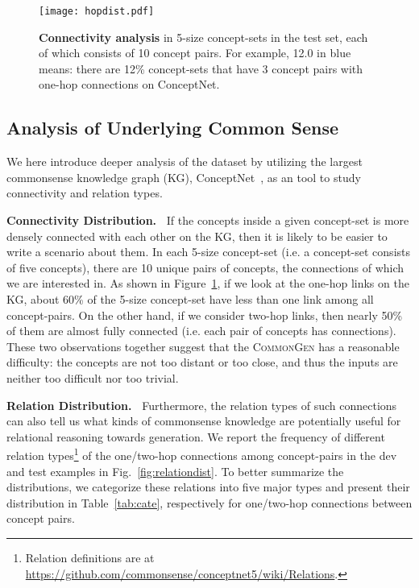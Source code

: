 \documentclass[11pt,a4paper]{article}
\begin{document}
	
    \begin{figure}[t!]
		\centering
		\texttt{[image: hopdist.pdf]}
		\caption{\small \textbf{Connectivity analysis} in 5-size concept-sets in the test set, each of which consists of 10 concept pairs. {For example, 12.0 in blue means: there are 12\% concept-sets that have 3 concept pairs with one-hop connections on ConceptNet.}}
		\label{fig:connectivity}
	\end{figure}

	
	
	\subsection{Analysis of Underlying Common Sense}
	\label{ssec:analysis}
We here introduce deeper analysis of the dataset by utilizing the largest commonsense knowledge graph (KG), ConceptNet~\cite{Speer2017ConceptNet5A}, as an tool to study connectivity and relation types.
    
    \smallskip
    \noindent
    \textbf{Connectivity Distribution.~} 
    If the concepts inside a given concept-set is more densely connected with each other on the KG, then it is likely to be easier to write a scenario about them.
In each 5-size concept-set (i.e. a concept-set consists of five concepts), 
    there are 10 unique pairs of concepts, the connections of which we are interested in. 
    As shown in Figure~\ref{fig:connectivity}, if we look at the one-hop links on the KG, about 60\% of the 5-size concept-set have less than one link among all concept-pairs.
    On the other hand, if we consider two-hop links, then nearly 50\% of them are almost fully connected (i.e. each pair of concepts has connections).
    These two observations together suggest that the \textsc{CommonGen} has a reasonable difficulty: the concepts are not too distant or too close, and thus the inputs are neither too difficult nor too trivial. 
    
    \smallskip
    \noindent
    \textbf{Relation Distribution.~}
    Furthermore, the relation types of such connections can also tell us what kinds of commonsense knowledge are potentially useful for relational reasoning towards generation.
    We report the frequency of different relation types\footnote{ Relation definitions are at \url{https://github.com/commonsense/conceptnet5/wiki/Relations}.} of the one/two-hop connections among concept-pairs in the dev and test examples in Fig.~\ref{fig:relationdist}.
    To better summarize the distributions, 
    we categorize these relations into five major types and present their distribution in Table~\ref{tab:cate}, respectively for one/two-hop connections between concept pairs.
    
\end{document}
